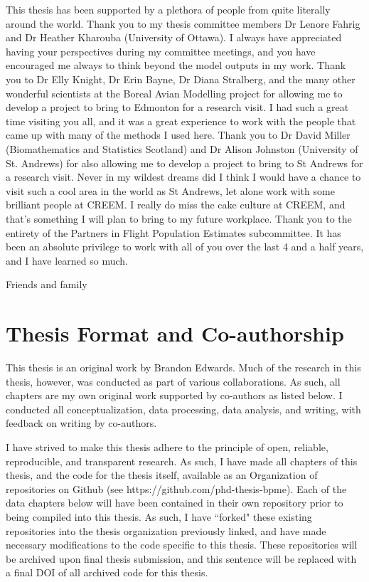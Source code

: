 \par This thesis has been supported by a plethora of people from quite literally around the world. 
Thank you to my thesis committee members Dr Lenore Fahrig and Dr Heather Kharouba (University of Ottawa).
I always have appreciated having your perspectives during my committee meetings, and you have encouraged me always to think beyond the model outputs in my work.
Thank you to Dr Elly Knight, Dr Erin Bayne, Dr Diana Stralberg, and the many other wonderful scientists at the Boreal Avian Modelling project for allowing me to develop a project to bring to Edmonton for a research visit.
I had such a great time visiting you all, and it was a great experience to work with the people that came up with many of the methods I used here.
Thank you to Dr David Miller (Biomathematics and Statistics Scotland) and Dr Alison Johnston (University of St. Andrews) for also allowing me to develop a project to bring to St Andrews for a research visit.
Never in my wildest dreams did I think I would have a chance to visit such a cool area in the world as St Andrews, let alone work with some brilliant people at CREEM.
I really do miss the cake culture at CREEM, and that's something I will plan to bring to my future workplace.
Thank you to the entirety of the Partners in Flight Population Estimates subcommittee.
It has been an absolute privilege to work with all of you over the last 4 and a half years, and I have learned so much.

\par Friends and family



\chapter*{Thesis Format and Co-authorship}


\par This thesis is an original work by Brandon Edwards.
Much of the research in this thesis, however, was conducted as part of various collaborations.
As such, all chapters are my own original work supported by co-authors as listed below.
I conducted all conceptualization, data processing, data analysis, and writing, with feedback on writing by co-authors.

\par I have strived to make this thesis adhere to the principle of open, reliable, reproducible, and transparent research.
As such, I have made all chapters of this thesis, and the code for the thesis itself, available as an Organization of repositories on Github (see https://github.com/phd-thesis-bpme).
Each of the data chapters below will have been contained in their own repository prior to being compiled into this thesis.
As such, I have ``forked" these existing repositories into the thesis organization previously linked, and have made necessary modifications to the code specific to this thesis.
These repositories will be archived upon final thesis submission, and this sentence will be replaced with a final DOI of all archived code for this thesis.

